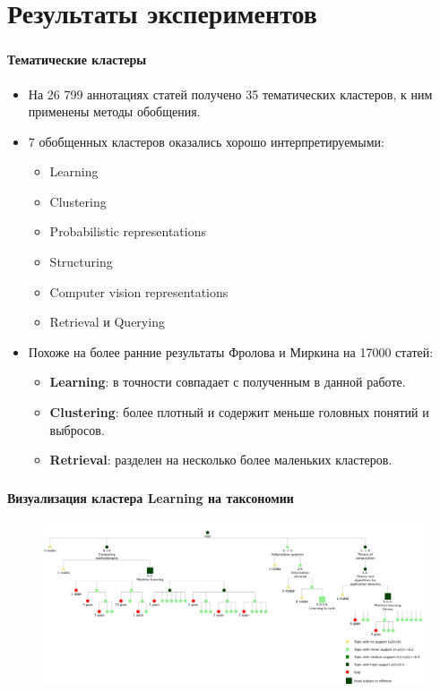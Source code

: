 \documentclass[aspectratio=169]{beamer}
\begin{document}
\section{Результаты экспериментов}

\begin{frame}
\frametitle{\insertsection}
\framesubtitle{Тематические кластеры}
\begin{itemize}
	\item  На 26 799 аннотациях статей получено 35 тематических кластеров, к ним применены методы обобщения.
	\item  7 обобщенных кластеров оказались хорошо интерпретируемыми:
	\begin{multicols}{2}
		\begin{itemize}
			\item Learning
			\item Clustering
			\item Probabilistic representations
			\item Structuring
			\item Computer vision representations
			\item Retrieval и Querying
		\end{itemize}
	\end{multicols}
	\item Похоже на более ранние результаты Фролова и Миркина на 17000 статей:
	\begin{itemize}
		\item \textbf{Learning}: в точности совпадает с полученным в данной работе.
		\item \textbf{Clustering}: более плотный и содержит меньше головных понятий и выбросов.
		\item \textbf{Retrieval}: разделен на несколько более маленьких кластеров.
	\end{itemize}
\end{itemize}

\end{frame}

\begin{frame}
	\frametitle{\insertsection}
	\framesubtitle{Визуализация кластера Learning на таксономии}
	\begin{figure}
		\includegraphics[width=1.\linewidth, clip]{images/cluster_lift_tree_00_learning}
	\end{figure}

\end{frame}
\end{document}
